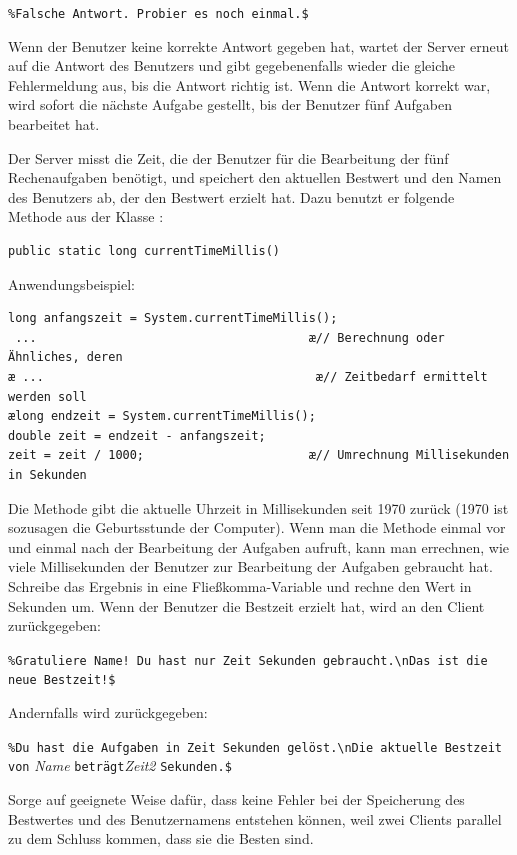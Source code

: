 \lstinline|%Falsche Antwort. Probier es noch einmal.$|

Wenn der Benutzer keine korrekte Antwort gegeben hat, wartet der Server erneut
auf die Antwort des Benutzers und gibt gegebenenfalls wieder die gleiche
Fehlermeldung aus, bis die Antwort richtig ist. Wenn die Antwort korrekt war,
wird sofort die nächste Aufgabe gestellt, bis der Benutzer fünf Aufgaben
bearbeitet hat.

Der Server misst die Zeit, die der Benutzer für die Bearbeitung der fünf
Rechenaufgaben benötigt, und speichert den aktuellen Bestwert und den Namen des
Benutzers ab, der den Bestwert erzielt hat. Dazu benutzt er folgende Methode
aus der Klasse :

\begin{lstlisting}
public static long currentTimeMillis()
\end{lstlisting}

Anwendungsbeispiel:

\begin{lstlisting}
long anfangszeit = System.currentTimeMillis();
 ...                                      æ// Berechnung oder Ähnliches, deren
æ ...                                      æ// Zeitbedarf ermittelt werden soll
ælong endzeit = System.currentTimeMillis();
double zeit = endzeit - anfangszeit;
zeit = zeit / 1000;                       æ// Umrechnung Millisekunden in Sekunden
\end{lstlisting}

Die Methode gibt die aktuelle Uhrzeit in Millisekunden seit 1970 zurück (1970
ist sozusagen die Geburtsstunde der Computer). Wenn man die Methode einmal vor
und einmal nach der Bearbeitung der Aufgaben aufruft, kann man errechnen, wie
viele Millisekunden der Benutzer zur Bearbeitung der Aufgaben gebraucht hat.
Schreibe das Ergebnis in eine Fließkomma-Variable und rechne den Wert in
Sekunden um. Wenn der Benutzer die Bestzeit erzielt hat, wird an den Client
zurückgegeben:

\lstinline|%Gratuliere Name! Du hast nur Zeit Sekunden gebraucht.\nDas ist die neue Bestzeit!$|

Andernfalls wird zurückgegeben:

\lstinline|%Du hast die Aufgaben in Zeit Sekunden gelöst.\nDie aktuelle Bestzeit von| 
\emph{Name} \lstinline|beträgt|\linebreak \emph{Zeit2} \lstinline|Sekunden.$|

Sorge auf geeignete Weise dafür, dass keine Fehler bei der Speicherung des
Bestwertes und des Benutzernamens entstehen können, weil zwei Clients parallel
zu dem Schluss kommen, dass sie die Besten sind.

